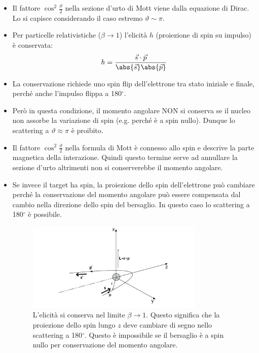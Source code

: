 \begin{itemize}
    \item Il fattore $\cos^2\frac\vartheta2$ nella sezione d'urto di Mott viene dalla equazione di Dirac. Lo si capisce considerando il caso estremo $\vartheta\sim\pi$.
    \item Per particelle relativistiche ($\beta\to1$) l'elicità $h$ (proiezione di spin su impulso) è conservata:
    \begin{equation*}
    h=\frac{\vec s\cdot \vec p}{\abs{\vec s}\abs{\vec p}}
    \end{equation*}
    \item La conservazione richiede uno spin flip dell'elettrone tra stato iniziale e finale, perché anche l'impulso flippa a 180$^\circ$.
    \item Però in questa condizione, il momento angolare NON si conserva se il nucleo non assorbe la variazione di spin (e.g. perché è a spin nullo). Dunque lo scattering a $\vartheta\approx\pi$ è proibito.
    \item Il fattore $\cos^2\frac\vartheta2$ nella formula di Mott è connesso allo spin e descrive la parte magnetica della interazione. Quindi questo termine serve ad annullare la sezione d'urto altrimenti non si conserverebbe il momento angolare.
    \item Se invece il target ha spin, la proiezione dello spin dell'elettrone può cambiare perché la conservazione del momento angolare può essere compensata dal cambio nella direzione dello spin del bersaglio. In questo caso lo scattering a 180$^\circ$ è possibile.
    \begin{figure}[H]
        \centering
        \includegraphics[width=0.8\textwidth]{immagini/fig_elic_mott.png}
        \caption{L'elicità si conserva nel limite $\beta\to1$. Questo significa che la proiezione dello spin lungo $z$ deve cambiare di segno nello scattering a 180$^\circ$. Questo è impossibile se il bersaglio è a spin nullo per conservazione del momento angolare.}
    \end{figure}
\end{itemize}
